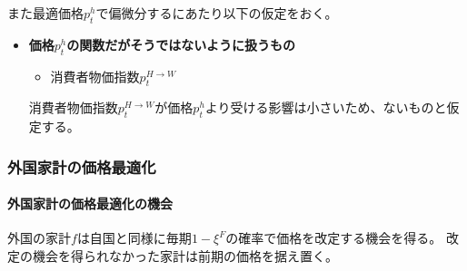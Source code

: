 また最適価格\(p_t^h\)で偏微分するにあたり以下の仮定をおく。
\begin{itemize}
    \item
    \label{itm:chapter3_assumptions_producer_optimization_home_calculation_assumption}
        \textbf{価格\(p_t^h\)の関数だがそうではないように扱うもの}
        \begin{itemize}
            \item 消費者物価指数\(p_t^{H\to W}\)
        \end{itemize}
        消費者物価指数\(p_t^{H\to W}\)が価格\(p_t^h\)より受ける影響は小さいため、ないものと仮定する。
\end{itemize}

\subsubsection{外国家計の価格最適化}
\label{sec:chapter3_assumptions_producer_optimization_foreign}

\paragraph{外国家計の価格最適化の機会}
\label{sec:chapter3_assumptions_producer_optimization_foreign_opportunity}
外国の家計\(f\)は自国と同様に毎期\(1-\xi^F\)の確率で価格を改定する機会を得る。
改定の機会を得られなかった家計は前期の価格を据え置く。

